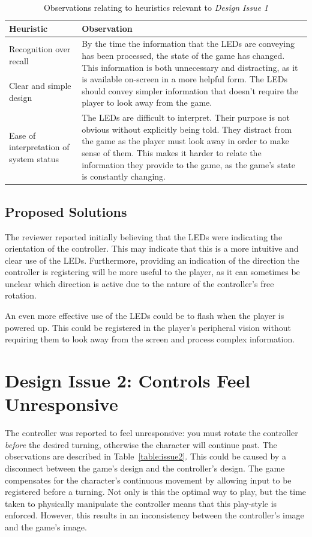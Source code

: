 \documentclass{scrartcl}
\begin{document}
\begin{table}
\centering
\def\arraystretch{5}
\noindent
\begin{tabular}{|l|m{6cm}|}
\hline
\textbf{Heuristic} & \textbf{Observation} \\ \hline
Recognition over recall & 
\multirow{2}{6cm}{By the time the information that the LEDs are conveying has been processed, the state of the game has changed. This information is both unnecessary and distracting, as it is available on-screen in a more helpful form. The LEDs should convey simpler information that doesn't require the player to look away from the game.} \\
\cline{1-1}   
Clear and simple design  & \\ \hline

Ease of interpretation of system status & 
The LEDs are difficult to interpret. Their purpose is not obvious without explicitly being told. They distract from the game as the player must look away in order to make sense of them. This makes it harder to relate the information they provide to the game, as the game's state is constantly changing. \\ \hline
\end{tabular}
\caption{Observations relating to heuristics relevant to \textit{Design Issue 1}}
\label{table:issue1}
\end{table}

\subsection{Proposed Solutions}
The reviewer reported initially believing that the LEDs were indicating the orientation of the controller. This may indicate that this is a more intuitive and clear use of the LEDs. Furthermore, providing an indication of the direction the controller is registering will be more useful to the player, as it can sometimes be unclear which direction is active due to the nature of the controller's free rotation. 

An even more effective use of the LEDs could be to flash when the player is powered up. This could be registered in the player's peripheral vision without requiring them to look away from the screen and process complex information.

\section{Design Issue 2: Controls Feel Unresponsive}
The controller was reported to feel unresponsive: you must rotate the controller \textit{before} the desired turning, otherwise the character will continue past. The observations are described in Table~\ref{table:issue2}. This could be caused by a disconnect between the game's design and the controller's design. The game compensates for the character's continuous movement by allowing input to be registered before a turning. Not only is this the optimal way to play, but the time taken to physically manipulate the controller means that this play-style is enforced. However, this results in an inconsistency between the controller's image and the game's image.
\end{document}
